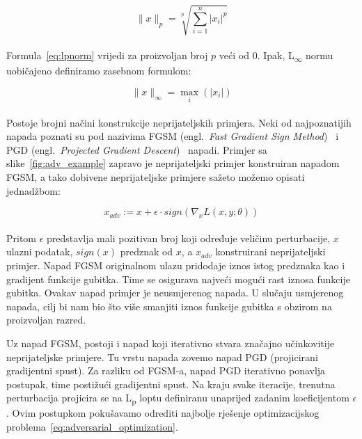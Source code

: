 \documentclass[times, utf8, zavrsni, numeric]{fer}
\begin{document}
\begin{equation}
    \lVert x \rVert_{p} = \sqrt[p]{\sum_{i = 1}^{n}|x_{i}|^p}
    \label{eq:lpnorm}
\end{equation}
\\
Formula~\ref{eq:lpnorm} vrijedi za proizvoljan broj $p$ veći od 0. Ipak, L\textsubscript{$\infty$} normu uobičajeno definiramo zasebnom formulom:

\begin{equation}
    \lVert x \rVert_{\infty} = \max_{i}(|x_{i}|)
    \label{eq:linfnorm}
\end{equation}
\\
Postoje brojni načini konstrukcije neprijateljskih primjera. 
Neki od najpoznatijih napada poznati su pod nazivima FGSM (engl.\ \textit{Fast Gradient Sign Method})~\cite{goodfellow2014explaining} i PGD (engl.\ \textit{Projected Gradient Descent})~\cite{madry2017towards} napadi.
Primjer sa slike~\ref{fig:adv_example} zapravo je neprijateljski primjer konstruiran napadom FGSM, a tako dobivene neprijateljske primjere sažeto možemo opisati jednadžbom:

\begin{equation}
    x_{adv} := x + \epsilon \cdot sign(\nabla_{x}L(x,y;\theta))
    \label{eq:fgsm}
\end{equation}
\\
Pritom $\epsilon$ predstavlja mali pozitivan broj koji određuje veličinu perturbacije, $x$ ulazni podatak, $sign(x)$ predznak od $x$, a $x_{adv}$ konstruirani neprijateljski primjer. 
Napad FGSM originalnom ulazu pridodaje iznos istog predznaka kao i gradijent funkcije gubitka. Time se osigurava najveći mogući rast iznosa funkcije gubitka. 
Ovakav napad primjer je neusmjerenog napada. U slučaju usmjerenog napada, cilj bi nam bio što više smanjiti iznos funkcije gubitka s obzirom na proizvoljan razred.

Uz napad FGSM, postoji i napad koji iterativno stvara značajno učinkovitije neprijateljske primjere. 
Tu vrstu napada zovemo napad PGD (projicirani gradijentni spust). Za razliku od FGSM-a, napad PGD iterativno ponavlja postupak, time postižući gradijentni spust.
Na kraju svake iteracije, trenutna perturbacija projicira se na L\textsubscript{p} loptu definiranu unaprijed zadanim koeficijentom $\epsilon$.
Ovim postupkom pokušavamo odrediti najbolje rješenje optimizacijskog problema~\ref{eq:adversarial_optimization}.
\end{document}
